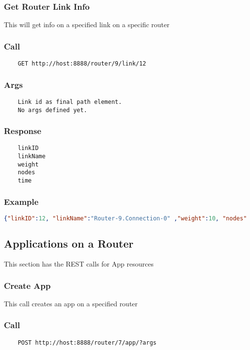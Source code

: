 \hr
\subsubsection{Get Router Link Info}
This will get info on a specified link on a specific router
\subsubsection*{Call}
\begin{verbatim}
	GET http://host:8888/router/9/link/12
\end{verbatim}

\subsubsection*{Args}
\begin{verbatim}
	Link id as final path element.
	No args defined yet.
\end{verbatim}

\subsubsection*{Response}
\begin{verbatim}
	linkID
	linkName
	weight
	nodes
	time
\end{verbatim}

\subsubsection*{Example}
\begin{lstlisting}[language=json]
{"linkID":12, "linkName":"Router-9.Connection-0" ,"weight":10, "nodes":[9,10], "time":1362080281512}
\end{lstlisting}


\subsection{Applications on a Router}

This section has the REST calls for App resources

\hr
\subsubsection{Create App}
This call creates an app on a specified router
\subsubsection*{Call}
\begin{verbatim}
	POST http://host:8888/router/7/app/?args
\end{verbatim}

